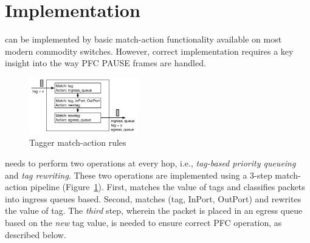 \section{Implementation}\label{sec:implementation}

\sysname{} can be implemented by basic match-action functionality
available on most modern commodity switches. However, correct implementation
requires a key insight into the way PFC PAUSE frames are handled.

\begin{figure}
	\centering
	\includegraphics[width=0.42\textwidth] {figs/Tagger}
	\caption{Tagger match-action rules}\label{fig:tagger}
\end{figure}

 \sysname{} needs to perform two operations at every
hop, i.e., {\em tag-based priority queueing} and {\em tag
rewriting}.  These two operations are implemented using a 3-step match-action
pipeline (Figure~\ref{fig:tagger}).  First, \sysname{} matches
the value of tags and classifies packets into ingress queues based. Second, 
\sysname{} matches (tag, InPort, OutPort) and rewrites the value of tag. 
The {\em third} step, wherein the packet is placed in an egress queue based on the
{\em new} tag value, is needed to ensure correct PFC operation, as described below.

